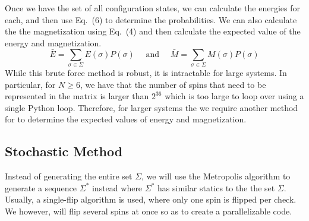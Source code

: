\documentclass{llncs}
\begin{document}
Once we have the set of all configuration states, we can calculate the energies for each, and then use Eq.~(6) to determine the probabilities. We can also calculate the the magnetization using Eq.~(4) and then calculate the expected value of the energy and magnetization. 
\begin{equation}
\bar E=\sum_{\sigma\in\Sigma}E(\sigma)P(\sigma)\quad \textrm{ and }\quad \bar M=\sum_{\sigma\in\Sigma}M(\sigma)P(\sigma)
\end{equation}
While this brute force method is robust, it is intractable for large systems. In particular, for $N\geq 6$, we have that the number of spins that need to be represented in the matrix is larger than $2^{36}$ which is too large to loop over using a single Python loop. Therefore, for larger systems the we require another method for to determine the expected values of energy and magnetization. 

\subsection{Stochastic Method}
Instead of generating the entire set $\Sigma$, we will use the Metropolis algorithm to generate a sequence $\Sigma^*$ instead where $\Sigma^*$ has similar statics to the the set $\Sigma$. Usually, a single-flip algorithm is used, where only one spin is flipped per check. We however, will flip several spins at once so as to create a parallelizable code.  
\end{document}
